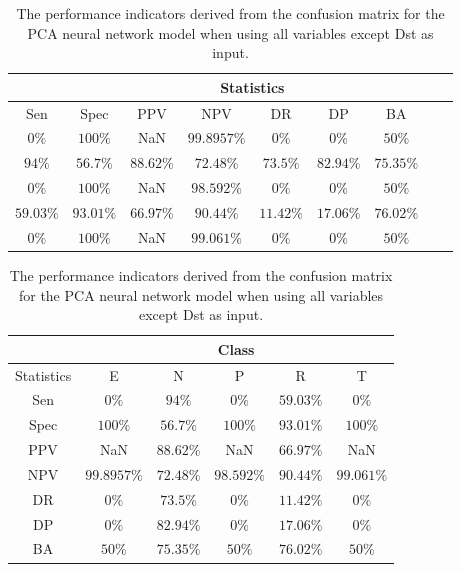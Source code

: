 \begin{table}[!ht]
	\centering
	\begin{tabular}{|c|c|c|c|c|c|c|c|c|}
		\hline
		 & \multicolumn{7}{c|}{Statistics} \\ \hline
		Sen & Spec & PPV & NPV & DR & DP & BA \\ \hline
		$0\%$ & $100\%$ & NaN & $99.8957\%$ & $0\%$ & $0\%$ & $50\%$ \\ \hline
		$94\%$ & $56.7\%$ & $88.62\%$ & $72.48\%$ & $73.5\%$ & $82.94\%$ & $75.35\%$ \\ \hline
		$0\%$ & $100\%$ & NaN & $98.592\%$ & $0\%$ & $0\%$ & $50\%$ \\ \hline
		$59.03\%$ & $93.01\%$ & $66.97\%$ & $90.44\%$ & $11.42\%$ & $17.06\%$ & $76.02\%$ \\ \hline
		$0\%$ & $100\%$ & NaN & $99.061\%$ & $0\%$ & $0\%$ & $50\%$ \\ \hline
	\end{tabular}
	\caption{The performance indicators derived from the confusion matrix for the PCA neural network model when using all variables except Dst as input.}
	\label{tab:cs:noDst:pcaNNet}
\end{table}

\begin{table}[!ht]
	\centering
	\begin{tabular}{|c|c|c|c|c|c|}
		\hline
		 & \multicolumn{5}{c|}{Class} \\ \hline
		Statistics & E & N & P & R & T \\ \hline
		Sen & $0\%$ & $94\%$ & $0\%$ & $59.03\%$ & $0\%$ \\ \hline
		Spec & $100\%$ & $56.7\%$ & $100\%$ & $93.01\%$ & $100\%$ \\ \hline
		PPV & NaN & $88.62\%$ & NaN & $66.97\%$ & NaN \\ \hline
		NPV & $99.8957\%$ & $72.48\%$ & $98.592\%$ & $90.44\%$ & $99.061\%$ \\ \hline
		DR & $0\%$ & $73.5\%$ & $0\%$ & $11.42\%$ & $0\%$ \\ \hline
		DP & $0\%$ & $82.94\%$ & $0\%$ & $17.06\%$ & $0\%$ \\ \hline
		BA & $50\%$ & $75.35\%$ & $50\%$ & $76.02\%$ & $50\%$ \\ \hline
	\end{tabular}
	\caption{The performance indicators derived from the confusion matrix for the PCA neural network model when using all variables except Dst as input.}
	\label{tab:cs:reverse:noDst:pcaNNet}
\end{table}

